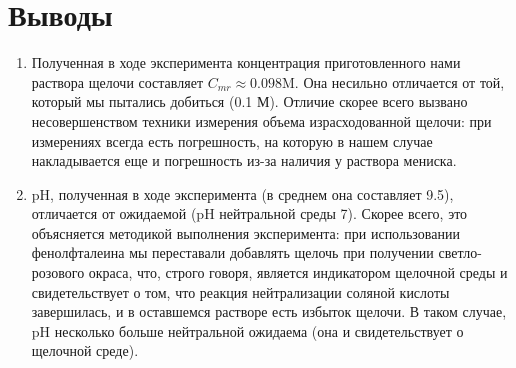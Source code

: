 \documentclass[a4paper, 12pt]{article}
\begin{document}
\section{Выводы}

\begin{enumerate}
	\item Полученная в ходе эксперимента концентрация приготовленного нами раствора щелочи составляет $\boxed{C_{mr} \approx 0.098 \text{M}}$. Она несильно отличается от той, который мы пытались добиться (0.1 М). Отличие скорее всего вызвано несовершенством техники измерения объема израсходованной щелочи: при измерениях всегда есть погрешность, на которую в нашем случае накладывается еще и погрешность из-за наличия у раствора мениска.
	
	\item pH, полученная в ходе эксперимента (в среднем она составляет 9.5), отличается от ожидаемой (pH нейтральной среды 7). Скорее всего, это объясняется методикой выполнения эксперимента: при использовании фенолфталеина мы переставали добавлять щелочь при получении светло-розового окраса, что, строго говоря, является индикатором щелочной среды и свидетельствует о том, что реакция нейтрализации соляной кислоты завершилась, и в оставшемся растворе есть избыток щелочи. В таком случае, pH несколько больше нейтральной ожидаема (она и свидетельствует о щелочной среде).
\end{enumerate}


	
\end{document}
